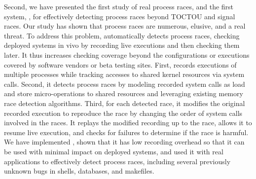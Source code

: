 Second, we have presented the first study of real process races, and the first
system, \racepro, for effectively detecting process races beyond TOCTOU
and signal races.   Our study has shown that process races are
numerous, elusive, and a real threat.  To address this problem, \racepro
automatically detects process races, checking deployed
systems in vivo by recording live executions and then checking
them later.  It thus increases checking coverage beyond the
configurations or executions covered by software vendors or beta
testing sites.  First, \racepro records executions of multiple processes
while tracking accesses to shared kernel resources via system
calls. Second, it detects process races by modeling recorded system
calls as load and store micro-operations to shared resources and
leveraging existing memory race detection algorithms.  Third, for each
detected race, it modifies the original recorded execution to
reproduce the race by changing the order of system calls involved in
the races.  It replays the modified recording up to the race, allows
it to resume live execution, and checks for failures to determine if
the race is harmful.  We have implemented \racepro, shown that it has
low recording overhead so that it can be used with minimal impact on
deployed systems, and used it with real applications to effectively
detect \nracepro process races, including several previously unknown
bugs in shells, databases, and makefiles.

